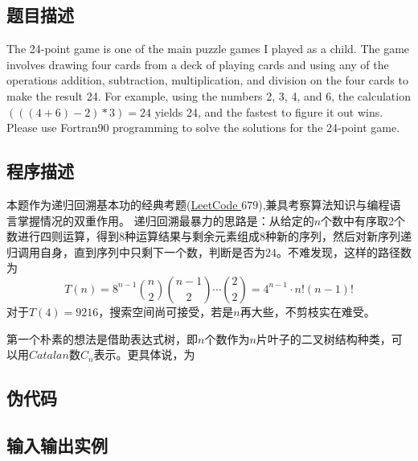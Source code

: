 \subsection{题目描述}
The 24-point game is one of the main puzzle games I played as a child.
The game involves drawing four cards from a deck of playing cards and using any of the operations addition, subtraction, multiplication, and division on the four cards to make the result 24.
For example, using the numbers 2, 3, 4, and 6, the calculation $(((4+6)-2)*3)=24$ yields 24, and the fastest to figure it out wins. Please use Fortran90 programming to solve the solutions for the 24-point game.
\subsection{程序描述}
本题作为递归回溯基本功的经典考题(\href{https://leetcode.com/problems/24-game/description/}{LeetCode $679$}),兼具考察算法知识与编程语言掌握情况的双重作用。
递归回溯最暴力的思路是：从给定的$n$个数中有序取2个数进行四则运算，得到8种运算结果与剩余元素组成8种新的序列，然后对新序列递归调用自身，直到序列中只剩下一个数，判断是否为$24$。不难发现，这样的路径数为
\[
T(n) = 8^{n-1} \binom{n}{2} \binom{n-1}{2}\cdots \binom{2}{2} = 4^{n-1} \cdot n!(n-1)!
\]
对于$T(4)=9216$，搜索空间尚可接受，若是$n$再大些，不剪枝实在难受。

第一个朴素的想法是借助表达式树，即$n$个数作为$n$片叶子的二叉树结构种类，可以用$Catalan$数$C_n$表示。更具体说，为
\subsection{伪代码}

\subsection{输入输出实例}
